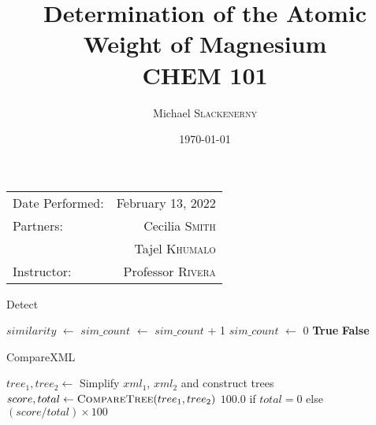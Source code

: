 \documentclass[
	letterpaper, %
	10pt, %
]{article} %
\title{Determination of the Atomic \\ Weight of Magnesium \\ CHEM 101}
\author{Michael \textsc{Slackenerny}}
\date{\today}
\begin{document}
\maketitle

\begin{center}
	\begin{tabular}{l r}
		Date Performed: & February 13, 2022 \\
		Partners: & Cecilia \textsc{Smith} \\
		& Tajel \textsc{Khumalo} \\
		Instructor: & Professor \textsc{Rivera}
	\end{tabular}
\end{center}

\begin{algorithm}
\caption{Detect}
\begin{algorithmic}[1]
    \State $similarity$ $\gets$ 
    \State $sim\_count$ $\gets$ $sim\_count$ + 1
        \State $sim\_count$ $\gets$ 0
        \State \Return \textbf{True}
    \EndIf
\EndIf
\State \Return \textbf{False}
\EndFunction
\end{algorithmic}
\end{algorithm}

\begin{algorithm}
\caption{CompareXML}
\begin{algorithmic}[1]
    \State $tree_1, tree_2 \gets$ Simplify $xml_1$, $xml_2$ and construct trees
    \State $score, total \gets \Call{CompareTree}{tree_1, tree_2}$
    \State \Return $100.0$ if $total = 0$ else $(score / total) \times 100$
\EndFunction
\end{algorithmic}
\end{algorithm}
\end{document}
